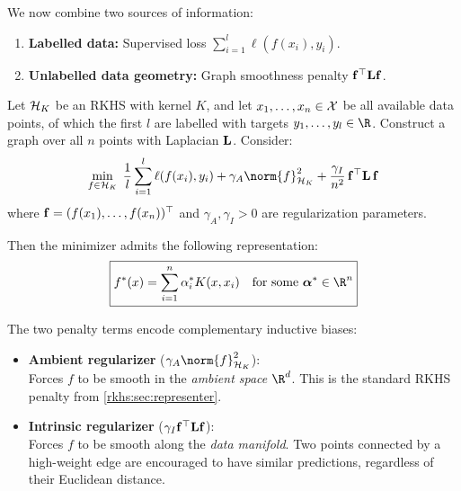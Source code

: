 \begin{notechapter}
We now combine two sources of information:

\begin{enumerate}[label=\emph{(\roman*)}]
  \item \textbf{Labelled data:} Supervised loss $\sum_{i=1}^l \ell(f(x_i), y_i)$.
  \item \textbf{Unlabelled data geometry:} Graph smoothness penalty
    $\mathbf{f}^\top \mathbf{L} \mathbf{f}$.
\end{enumerate}

\begin{theorem}
\label{rkhs:thm:manifold_reg}
Let $\mathcal{H}_K$ be an RKHS with kernel $K$, and let $x_1,\ldots,x_n \in \mathcal{X}$
be all available data points, of which the first $l$ are labelled with
targets $y_1,\ldots,y_l \in \R$. Construct a graph over all $n$ points
with Laplacian $\mathbf{L}$. Consider:
\begin{equation}
\label{rkhs:eq:manifold_reg}
\min_{f \in \hk}\; \frac{1}{l}\sum_{i=1}^{l} \ell(f(x_i), y_i)
+ \gamma_A \norm{f}_{\hk}^2
+ \frac{\gamma_I}{n^2}\,\mat{f}^\top \mat{L}\, \mat{f}
\end{equation}
where $\mathbf{f} = (f(x_1), \ldots, f(x_n))^\top$ and
$\gamma_A, \gamma_I > 0$ are regularization parameters.

Then the minimizer admits the following representation:
\begin{equation}
\label{rkhs:eq:manifold_solution}
\boxed{f^*(x) = \sum_{i=1}^n \alpha_i^* K(x, x_i)
\quad \text{for some } \vect{\alpha}^* \in \R^n}
\end{equation}
\end{theorem}

\begin{intuition}
The two penalty terms encode complementary inductive biases:

\begin{itemize}
  \item \textbf{Ambient regularizer} ($\gamma_A\norm{f}_{\hk}^2$): \\
  Forces $f$ to be smooth in the \emph{ambient space} $\R^d$. This is
  the standard RKHS penalty from \cref{rkhs:sec:representer}.

  \item \textbf{Intrinsic regularizer} ($\gamma_I \mathbf{f}^\top \mathbf{L} \mathbf{f}$): \\
  Forces $f$ to be smooth along the \emph{data manifold}. Two points
  connected by a high-weight edge are encouraged to have similar
  predictions, regardless of their Euclidean distance.
\end{itemize}


\end{intuition}
\end{notechapter}
